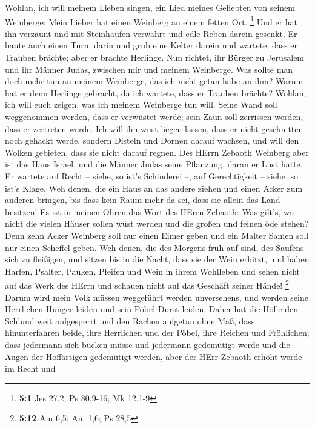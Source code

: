  Wohlan, ich will meinem Lieben singen, ein Lied meines
Geliebten von seinem Weinberge: Mein Lieber hat einen Weinberg an einem
fetten Ort. \footnote{\textbf{5:1} Jes 27,2; Ps 80,9-16; Mk 12,1-9}
 Und er hat ihn verzäunt und mit Steinhaufen verwahrt und
edle Reben darein gesenkt. Er baute auch einen Turm darin und grub eine
Kelter darein und wartete, dass er Trauben brächte; aber er brachte
Herlinge.  Nun richtet, ihr Bürger zu Jerusalem und ihr
Männer Judas, zwischen mir und meinem Weinberge.  Was sollte
man doch mehr tun an meinem Weinberge, das ich nicht getan habe an ihm?
Warum hat er denn Herlinge gebracht, da ich wartete, dass er Trauben
brächte?  Wohlan, ich will euch zeigen, was ich meinem
Weinberge tun will. Seine Wand soll weggenommen werden, dass er
verwüstet werde; sein Zaun soll zerrissen werden, dass er zertreten
werde.  Ich will ihn wüst liegen lassen, dass er nicht
geschnitten noch gehackt werde, sondern Disteln und Dornen darauf
wachsen, und will den Wolken gebieten, dass sie nicht darauf regnen.
 Des HErrn Zebaoth Weinberg aber ist das Haus Israel, und
die Männer Judas seine Pflanzung, daran er Lust hatte. Er wartete auf
Recht -- siehe, so ist's Schinderei --, auf Gerechtigkeit -- siehe, so
ist's Klage.  Weh denen, die ein Haus an das andere ziehen
und einen Acker zum anderen bringen, bis dass kein Raum mehr da sei,
dass sie allein das Land besitzen!  Es ist in meinen Ohren
das Wort des HErrn Zebaoth: Was gilt's, wo nicht die vielen Häuser
sollen wüst werden und die großen und feinen öde stehen? 
Denn zehn Acker Weinberg soll nur einen Eimer geben und ein Malter Samen
soll nur einen Scheffel geben.  Weh denen, die des Morgens
früh auf sind, des Saufens sich zu fleißigen, und sitzen bis in die
Nacht, dass sie der Wein erhitzt,  und haben Harfen,
Psalter, Pauken, Pfeifen und Wein in ihrem Wohlleben und sehen nicht auf
das Werk des HErrn und schauen nicht auf das Geschäft seiner Hände!
\footnote{\textbf{5:12} Am 6,5; Am 1,6; Ps 28,5}  Darum
wird mein Volk müssen weggeführt werden unversehens, und werden seine
Herrlichen Hunger leiden und sein Pöbel Durst leiden. 
Daher hat die Hölle den Schlund weit aufgesperrt und den Rachen aufgetan
ohne Maß, dass hinunterfahren beide, ihre Herrlichen und der Pöbel, ihre
Reichen und Fröhlichen;  dass jedermann sich bücken müsse
und jedermann gedemütigt werde und die Augen der Hoffärtigen gedemütigt
werden,  aber der HErr Zebaoth erhöht werde im Recht und
